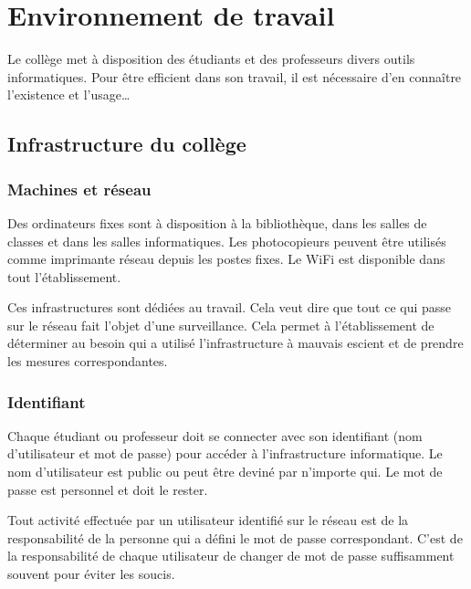 \documentclass[10pt,a4paper]{report}
\begin{document}
\chapterFormat




\chapter*{Environnement de travail}

Le collège met à disposition des étudiants et des professeurs divers outils informatiques. Pour être efficient dans son travail, il est nécessaire d'en connaître l'existence et l'usage\dots





\section{Infrastructure du collège}



\subsection{Machines et réseau}

Des ordinateurs fixes sont à disposition à la bibliothèque, dans les salles de classes et dans les salles informatiques. Les photocopieurs peuvent être utilisés comme imprimante réseau depuis les postes fixes. Le WiFi est disponible dans tout l'établissement.

Ces infrastructures sont dédiées au travail. Cela veut dire que tout ce qui passe sur le réseau fait l'objet d'une surveillance. Cela permet à l'établissement de déterminer au besoin qui a utilisé l'infrastructure à mauvais escient et de prendre les mesures correspondantes.



\subsection{Identifiant}

Chaque étudiant ou professeur doit se connecter avec son identifiant (nom d'utilisateur et mot de passe) pour accéder à l'infrastructure informatique. Le nom d'utilisateur est public ou peut être deviné par n'importe qui. Le mot de passe est personnel et doit le rester.

\attention Tout activité effectuée par un utilisateur identifié sur le réseau est de la responsabilité de la personne qui a défini le mot de passe correspondant. C'est de la responsabilité de chaque utilisateur de changer de mot de passe suffisamment souvent pour éviter les soucis.
\end{document}
